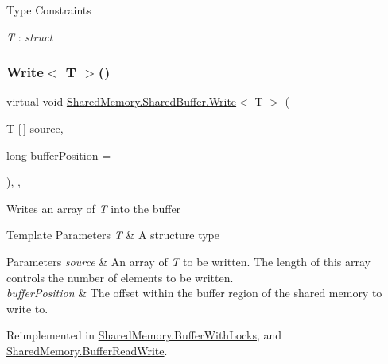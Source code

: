 \begin{Desc}
\item[Type Constraints]\begin{description}
\item[{\em T} : {\em struct}]\end{description}
\end{Desc}
\mbox{\label{class_shared_memory_1_1_shared_buffer_aff9ac6982aca4308738395c9a583d50e}} 
\subsubsection{\texorpdfstring{Write$<$ T $>$()}{Write< T >()}\hspace{0.1cm}{\footnotesize\ttfamily [2/3]}}
{\footnotesize\ttfamily virtual void \hyperlink{class_shared_memory_1_1_shared_buffer_acbe85aa71eaf1624fa5e03c0b026fa52}{Shared\+Memory.\+Shared\+Buffer.\+Write}$<$ T $>$ (\begin{DoxyParamCaption}\item[{T \mbox{[}$\,$\mbox{]}}]{source,  }\item[{long}]{buffer\+Position = {} }\end{DoxyParamCaption})\hspace{0.3cm}{\ttfamily [inline]}, {\ttfamily [protected]}, {\ttfamily [virtual]}}



Writes an array of {\itshape T}  into the buffer 


\begin{DoxyTemplParams}{Template Parameters}
{\em T} & A structure type\\
\hline
\end{DoxyTemplParams}

\begin{DoxyParams}{Parameters}
{\em source} & An array of {\itshape T}  to be written. The length of this array controls the number of elements to be written.\\
\hline
{\em buffer\+Position} & The offset within the buffer region of the shared memory to write to.\\
\hline
\end{DoxyParams}


Reimplemented in \hyperlink{class_shared_memory_1_1_buffer_with_locks_a8abfbb585b8bdea85b9ff71111b55679}{Shared\+Memory.\+Buffer\+With\+Locks}, and \hyperlink{class_shared_memory_1_1_buffer_read_write_a12cdb995bc498bef477b8f91355eef3f}{Shared\+Memory.\+Buffer\+Read\+Write}.

